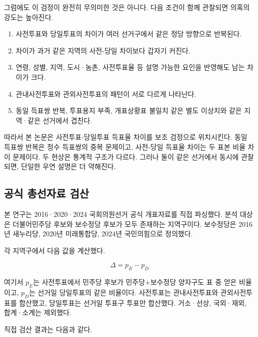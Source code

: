 \documentclass[preprint]{IEIE}
\begin{document}
그럼에도 이 검정이 완전히 무의미한 것은 아니다. 다음 조건이 함께 관찰되면 의혹의 강도는 높아진다.

\begin{enumerate}
\item 사전투표와 당일투표의 차이가 여러 선거구에서 같은 정당 방향으로 반복된다.
\item 차이가 과거 같은 지역의 사전-당일 차이보다 갑자기 커진다.
\item 연령, 성별, 지역, 도시·농촌, 사전투표율 등 설명 가능한 요인을 반영해도 남는 차이가 크다.
\item 관내사전투표와 관외사전투표의 패턴이 서로 다르게 나타난다.
\item 동일 득표쌍 반복, 투표용지 부족, 개표상황표 불일치 같은 별도 이상치와 같은 지역·같은 선거에서 겹친다.
\end{enumerate}

따라서 본 논문은 사전투표-당일투표 득표율 차이를 보조 검정으로 위치시킨다. 동일 득표쌍 반복은 정수 득표쌍의 중복 문제이고, 사전-당일 득표율 차이는 두 표본 비율 차이 문제이다. 두 현상은 통계적 구조가 다르다. 그러나 둘이 같은 선거에서 동시에 관찰되면, 단일한 우연 설명은 더 약해진다.

\subsection{공식 총선자료 검산}

본 연구는 2016·2020·2024 국회의원선거 공식 개표자료를 직접 파싱했다. 분석 대상은 더불어민주당 후보와 보수정당 후보가 모두 존재하는 지역구이다. 보수정당은 2016년 새누리당, 2020년 미래통합당, 2024년 국민의힘으로 정의했다.

각 지역구에서 다음 값을 계산했다.

\[
\Delta = p_E - p_D
\]

여기서 \(p_E\)는 사전투표에서 민주당 후보가 민주당+보수정당 양자구도 표 중 얻은 비율이고, \(p_D\)는 선거일 당일투표의 같은 비율이다. 사전투표는 관내사전투표와 관외사전투표를 합산했고, 당일투표는 선거일 투표구 투표만 합산했다. 거소·선상, 국외·재외, 합계·소계는 제외했다.

직접 검산 결과는 다음과 같다.

\begin{table}[t]
\centering
\scriptsize
{}
\end{table}
\end{document}
